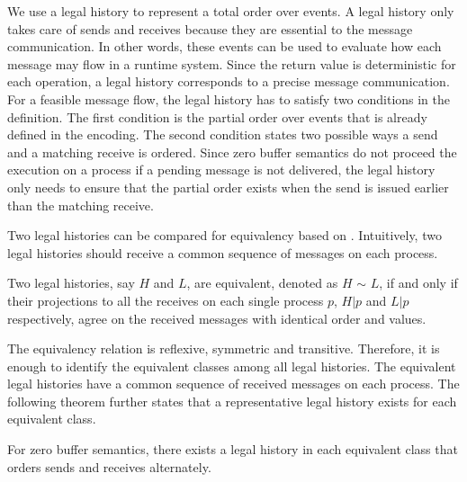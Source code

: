 We use a legal history to represent a total order over events. A legal history only takes care of sends and receives because they are essential to the message communication. In other words, these events can be used to evaluate how each message may flow in a runtime system. Since the return value is deterministic for each operation, a legal history corresponds to a precise message communication. For a feasible message flow, the legal history has to satisfy two conditions in the definition. The first condition is the partial order over events that is already defined in the encoding. The second condition states two possible ways a send and a matching receive is ordered. Since zero buffer semantics do not proceed the execution on a process if a pending message is not delivered, the legal history only needs to ensure that the partial order exists when the send is issued earlier than the matching receive. 


Two legal histories can be compared for equivalency based on . Intuitively, two legal histories should receive a common sequence of messages on each process. 

\begin{definition}\label{def:er}
Two legal histories, say $H$ and $L$, are equivalent, denoted as $H$ $\sim$ $L$, if and only if their projections to all the receives on each single process $p$, $H | p$ and $L | p$ respectively, agree on the received messages with identical order and values.
\end{definition}

The equivalency relation is reflexive, symmetric and transitive. Therefore, it is enough to identify the equivalent classes among all legal histories. The equivalent legal histories have a common sequence of received messages on each process. The following theorem further states that a representative legal history exists for each equivalent class. 

\begin{theorem}
For zero buffer semantics, there exists a legal history in each equivalent class that orders sends and receives alternately.
\end{theorem}

